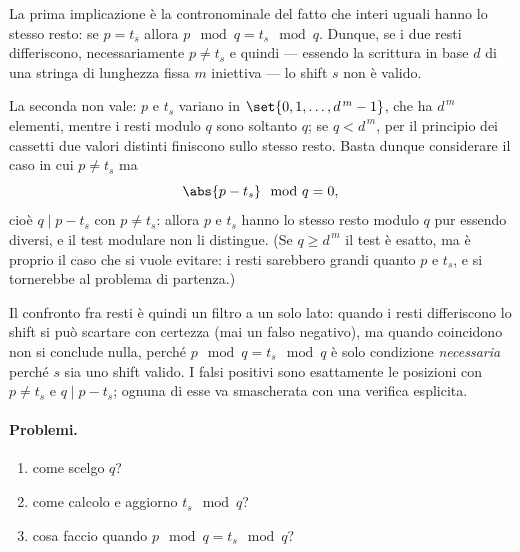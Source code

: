 \begin{dimostrazione}
La prima implicazione è la contronominale del fatto che interi uguali hanno lo stesso resto:
se $p = t_s$ allora $p \mod q = t_s \mod q$. Dunque, se i due resti differiscono,
necessariamente $p \neq t_s$ e quindi --- essendo la scrittura in base $d$ di una stringa di
lunghezza fissa $m$ iniettiva --- lo shift $s$ non è valido.

La seconda non vale: $p$ e $t_s$ variano in $\set{0,1,\dots,d^{\,m}-1}$, che ha $d^{\,m}$
elementi, mentre i resti modulo $q$ sono soltanto $q$; se $q < d^{\,m}$, per il principio dei
cassetti due valori distinti finiscono sullo stesso resto. Basta dunque considerare il caso in
cui $p \neq t_s$ ma
\[
  \abs{p - t_s} \mod q = 0,
\]
cioè $q \mid p - t_s$ con $p \neq t_s$: allora $p$ e $t_s$ hanno lo stesso resto modulo $q$
pur essendo diversi, e il test modulare non li distingue. (Se $q \ge d^{\,m}$ il test è
esatto, ma è proprio il caso che si vuole evitare: i resti sarebbero grandi quanto $p$ e
$t_s$, e si tornerebbe al problema di partenza.)
\end{dimostrazione}

\begin{osservazione}
Il confronto fra resti è quindi un filtro a un solo lato: quando i resti differiscono lo
shift si può scartare con certezza (mai un falso negativo), ma quando coincidono non si
conclude nulla, perché $p \mod q = t_s \mod q$ è solo condizione \emph{necessaria} perché $s$
sia uno shift valido. I falsi positivi sono esattamente le posizioni con $p \neq t_s$ e
$q \mid p - t_s$; ognuna di esse va smascherata con una verifica esplicita.
\end{osservazione}

\paragraph{Problemi.}
\begin{enumerate}
  \item[i)] come scelgo $q$?
  \item[ii)] come calcolo e aggiorno $t_s \mod q$?
  \item[iii)] cosa faccio quando $p \mod q = t_s \mod q$?
\end{enumerate}

